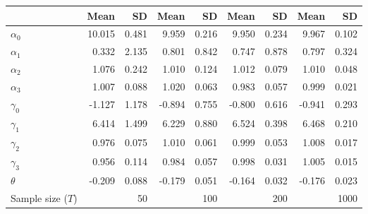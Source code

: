 
\begin{tabular}[t]{lrrrrrrrr}
\toprule
  & Mean & SD & Mean  & SD  & Mean   & SD   & Mean    & SD   \\
\midrule
$\alpha_{0}$ & 10.015 & 0.481 & 9.959 & 0.216 & 9.950 & 0.234 & 9.967 & 0.102\\
$\alpha_{1}$ & 0.332 & 2.135 & 0.801 & 0.842 & 0.747 & 0.878 & 0.797 & 0.324\\
$\alpha_{2}$ & 1.076 & 0.242 & 1.010 & 0.124 & 1.012 & 0.079 & 1.010 & 0.048\\
$\alpha_{3}$ & 1.007 & 0.088 & 1.020 & 0.063 & 0.983 & 0.057 & 0.999 & 0.021\\
$\gamma_{0}$ & -1.127 & 1.178 & -0.894 & 0.755 & -0.800 & 0.616 & -0.941 & 0.293\\
$\gamma_{1}$ & 6.414 & 1.499 & 6.229 & 0.880 & 6.524 & 0.398 & 6.468 & 0.210\\
$\gamma_{2}$ & 0.976 & 0.075 & 1.010 & 0.061 & 0.999 & 0.053 & 1.008 & 0.017\\
$\gamma_{3}$ & 0.956 & 0.114 & 0.984 & 0.057 & 0.998 & 0.031 & 1.005 & 0.015\\
$\theta$ & -0.209 & 0.088 & -0.179 & 0.051 & -0.164 & 0.032 & -0.176 & 0.023\\
Sample size ($T$) &  & 50 &  & 100 &  & 200 &  & 1000\\
\bottomrule
\end{tabular}
